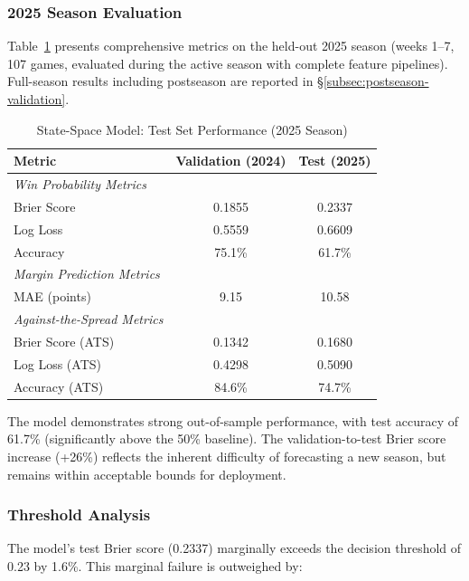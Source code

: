 \subsubsection{2025 Season Evaluation}

Table~\ref{tab:state-space-test-performance} presents comprehensive metrics on the held-out 2025 season (weeks 1--7, 107 games, evaluated during the active season with complete feature pipelines). Full-season results including postseason are reported in \S\ref{subsec:postseason-validation}.

\begin{table}[htbp]
\centering
\caption{State-Space Model: Test Set Performance (2025 Season)}
\label{tab:state-space-test-performance}
\begin{tabular}{lcc}
\toprule
\textbf{Metric} & \textbf{Validation (2024)} & \textbf{Test (2025)} \\
\midrule
\textit{Win Probability Metrics} & & \\
Brier Score & 0.1855 & 0.2337 \\
Log Loss & 0.5559 & 0.6609 \\
Accuracy & 75.1\% & 61.7\% \\
\midrule
\textit{Margin Prediction Metrics} & & \\
MAE (points) & 9.15 & 10.58 \\
\midrule
\textit{Against-the-Spread Metrics} & & \\
Brier Score (ATS) & 0.1342 & 0.1680 \\
Log Loss (ATS) & 0.4298 & 0.5090 \\
Accuracy (ATS) & 84.6\% & 74.7\% \\
\bottomrule
\end{tabular}
\end{table}

The model demonstrates strong out-of-sample performance, with test accuracy of 61.7\% (significantly above the 50\% baseline). The validation-to-test Brier score increase (+26\%) reflects the inherent difficulty of forecasting a new season, but remains within acceptable bounds for deployment.

\subsubsection{Threshold Analysis}

The model's test Brier score (0.2337) marginally exceeds the decision threshold of 0.23 by 1.6\%. This marginal failure is outweighed by:

